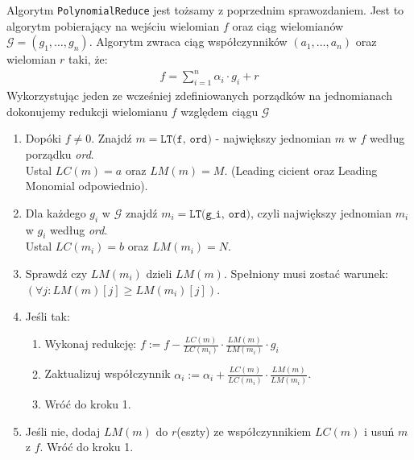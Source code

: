 \documentclass[10pt, a4paper]{article}
\begin{document}
Algorytm \texttt{PolynomialReduce} jest tożsamy z poprzednim sprawozdaniem. 
Jest to algorytm pobierający na wejściu wielomian $f$ oraz ciąg wielomianów $\mathcal{G}=(g_1,\dots,g_n)$. 
Algorytm zwraca ciąg współczynników $(a_1,\dots,a_n)$ oraz wielomian $r$ taki, że:
\begin{align*}
    f = \sum_{i=1}^{n} \alpha_i \cdot g_i + r
\end{align*}
Wykorzystując jeden ze wcześniej zdefiniowanych porządków na jednomianach dokonujemy redukcji wielomianu $f$ względem ciągu $\mathcal{G}$
\begin{enumerate}
    \item Dopóki $f \neq 0$. Znajdź $m=\texttt{LT(f, ord)}$ - największy jednomian $m$ w $f$ według porządku \textit{ord}. \\ Ustal $LC(m)=a$ oraz $LM(m)=M$. (Leading cicient oraz Leading Monomial odpowiednio).
    \item Dla każdego $g_i$ w $\mathcal{G}$ znajdź $m_i=\texttt{LT(g\_i, ord)}$, czyli największy jednomian $m_i$ w $g_i$ według \textit{ord}. \\ Ustal $LC(m_i)=b$ oraz $LM(m_i)=N$.
    \item Sprawdź czy $LM(m_i)$ dzieli $LM(m)$. Spełniony musi zostać warunek: $\left(\forall j: LM(m)[j] \geq LM(m_i)[j]\right)$.
    \item Jeśli tak:
    \begin{enumerate}
        \item Wykonaj redukcję: $f := f - \frac{LC(m)}{LC(m_i)} \cdot \frac{LM(m)}{LM(m_i)} \cdot g_i$
        \item Zaktualizuj współczynnik $\alpha_i := \alpha_i + \frac{LC(m)}{LC(m_i)} \cdot \frac{LM(m)}{LM(m_i)}$.
        \item Wróć do kroku 1.
    \end{enumerate}
    \item Jeśli nie, dodaj $LM(m)$ do $r$(eszty) ze współczynnikiem $LC(m)$ i usuń $m$ z $f$. Wróć do kroku 1.
\end{enumerate}
\end{document}
